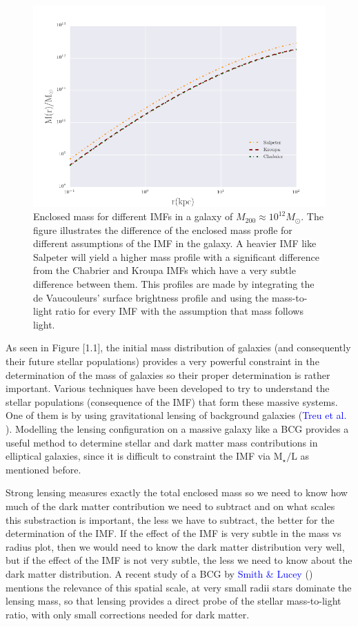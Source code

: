 \begin{figure}[H]
\centering
\includegraphics[width=12cm]{images/Enclosed_Mass_IMFs.png}
\caption[Enclosed mass for different IMFs in a galaxy]{Enclosed mass for different IMFs in a galaxy of $M_{200}\approx 10^{12} M_{\odot}$. The figure illustrates the difference of the enclosed mass profle for different assumptions of the IMF in the galaxy. A heavier IMF like Salpeter will yield a higher mass profile with a significant difference from the Chabrier and Kroupa IMFs which have a very subtle difference between them. This profiles are made by integrating the de Vaucouleurs' surface brightness profile and using the mass-to-light ratio for every IMF with the assumption that mass follows light.}
\end{figure}   

As seen in Figure [1.1], the initial mass distribution of galaxies (and consequently their future stellar populations) provides a very powerful constraint in the determination of the mass of galaxies so their proper determination is rather important. Various techniques have been developed to try to understand the stellar populations (consequence of the IMF) that form these massive systems. One of them is by using gravitational lensing  of  background galaxies (\textcolor{blue}{Treu et al.} \citeyear{Reference1}). Modelling the lensing configuration on a massive galaxy like a BCG provides a useful method to determine stellar and dark matter mass contributions in elliptical galaxies, since it is difficult to constraint the IMF via $\textrm{M}_{\star}/\text{L}$ as mentioned before. 

Strong lensing measures exactly the total enclosed mass so we need to know how much of the dark matter contribution we need to subtract and on what scales this substraction is important, the less we have to subtract, the better for the determination of the IMF. If the effect of the IMF is very subtle in the mass vs radius plot, then we would need to know the dark matter distribution very well, but if the effect of the IMF is not very subtle, the less we need to know about the dark matter distribution. A recent study of a BCG by \textcolor{blue}{Smith \& Lucey} (\citeyear{Reference7}) mentions the relevance of this spatial scale, at very small radii stars dominate the lensing mass, so that lensing provides a direct probe of the stellar mass-to-light ratio, with only small corrections needed for dark matter.  

